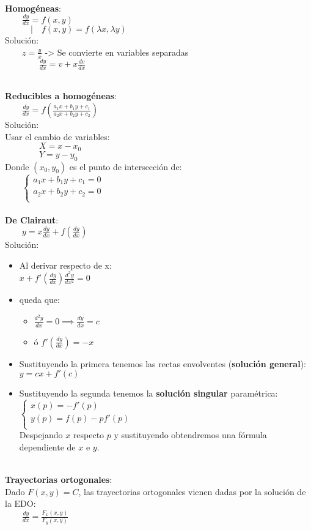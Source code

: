 \documentclass[a4paper,landscape,10pt]{cheatsheet}
\begin{document}
\hfill\\
\textbf{Homogéneas}:\\
$\qquad \frac{dy}{dx}=f(x,y)$\\
$\qquad\quad | \quad f(x,y)=f(\lambda x, \lambda y)$\\
Solución:\\
$\qquad z=\frac{y}{x}$ -> Se convierte en variables separadas\\
$\qquad\qquad \frac{dy}{dx}=v+x\frac{dv}{dx}$

\hfill\\
\textbf{Reducibles a homogéneas}:\\
$\qquad \frac{dy}{dx}=f(\frac{a_1x+b_1y+c_1}{a_2x+b_2y+c_2})$\\
Solución:\\
\qquad Usar el cambio de variables:\\
$\qquad\qquad X=x-x_0$\\
$\qquad\qquad Y=y-y_0$\\
\qquad Donde $(x_0,y_0)$ es el punto de intersección de:\\
$\qquad\begin{cases}
    a_1x+b_1y+c_1=0 \\
    a_2x+b_2y+c_2=0 \\
  \end{cases}
$\\


\hfill\\
\textbf{De Clairaut}:\\
$\qquad y=x\frac{dy}{dx}+f(\frac{dy}{dx})$\\
Solución:\\
\begin{itemize}
  \item Al derivar respecto de x:\\
        $x+f'(\frac{dy}{dx})\frac{d^2y}{dx^2}=0$\\
  \item queda que:\\
        \begin{itemize}
          \item $\frac{d^2y}{dx}=0\implies\frac{dy}{dx}=c$
          \item ó $f'(\frac{dy}{dx})=-x$
        \end{itemize}
  \item Sustituyendo la primera tenemos las rectas envolventes (\textbf{solución general}):\\
        $y=cx+f'(c)$\\
  \item Sustituyendo la segunda tenemos la \textbf{solución singular} paramétrica:\\
        $
          \begin{cases}
            x(p)=-f'(p)      \\
            y(p)=f(p)-pf'(p) \\
          \end{cases}
        $\\
        Despejando $x$ respecto $p$ y sustituyendo obtendremos una fórmula dependiente de $x$ e $y$.
\end{itemize}


\hfill\\
\textbf{Trayectorias ortogonales}:\\
Dado $F(x,y)=C$, las trayectorias ortogonales vienen dadas por la solución de la EDO:\\
$\qquad \frac{dy}{dx}=\frac{F_x(x,y)}{F_y(x,y)}$\\
\end{document}
